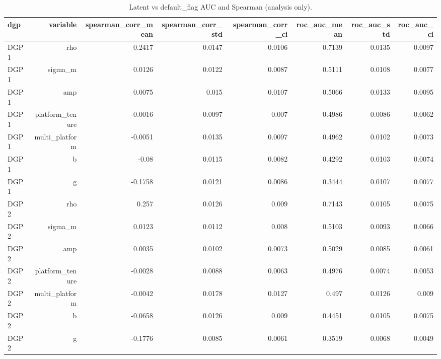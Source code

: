 \begin{table}[htbp]
  \centering
  \caption{Latent vs default\_flag AUC and Spearman (analysis only).}
  \label{tab:T3_dgp_latent}
  \small
  \begin{tabular}{lrrrrrrr}
    \toprule
    dgp & variable & spearman\_corr\_mean & spearman\_corr\_std & spearman\_corr\_ci & roc\_auc\_mean & roc\_auc\_std & roc\_auc\_ci \\
    \midrule
    DGP1 & rho & 0.2417 & 0.0147 & 0.0106 & 0.7139 & 0.0135 & 0.0097 \\
    DGP1 & sigma\_m & 0.0126 & 0.0122 & 0.0087 & 0.5111 & 0.0108 & 0.0077 \\
    DGP1 & amp & 0.0075 & 0.015 & 0.0107 & 0.5066 & 0.0133 & 0.0095 \\
    DGP1 & platform\_tenure & -0.0016 & 0.0097 & 0.007 & 0.4986 & 0.0086 & 0.0062 \\
    DGP1 & multi\_platform & -0.0051 & 0.0135 & 0.0097 & 0.4962 & 0.0102 & 0.0073 \\
    DGP1 & b & -0.08 & 0.0115 & 0.0082 & 0.4292 & 0.0103 & 0.0074 \\
    DGP1 & g & -0.1758 & 0.0121 & 0.0086 & 0.3444 & 0.0107 & 0.0077 \\
    DGP2 & rho & 0.257 & 0.0126 & 0.009 & 0.7143 & 0.0105 & 0.0075 \\
    DGP2 & sigma\_m & 0.0123 & 0.0112 & 0.008 & 0.5103 & 0.0093 & 0.0066 \\
    DGP2 & amp & 0.0035 & 0.0102 & 0.0073 & 0.5029 & 0.0085 & 0.0061 \\
    DGP2 & platform\_tenure & -0.0028 & 0.0088 & 0.0063 & 0.4976 & 0.0074 & 0.0053 \\
    DGP2 & multi\_platform & -0.0042 & 0.0178 & 0.0127 & 0.497 & 0.0126 & 0.009 \\
    DGP2 & b & -0.0658 & 0.0126 & 0.009 & 0.4451 & 0.0105 & 0.0075 \\
    DGP2 & g & -0.1776 & 0.0085 & 0.0061 & 0.3519 & 0.0068 & 0.0049 \\
    \bottomrule
  \end{tabular}
\end{table}
